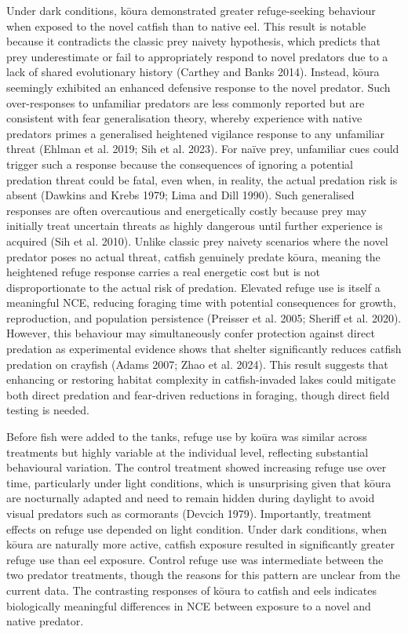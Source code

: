 \documentclass[
  12pt,
  a4paper,
]{scrbook}
\begin{document}
Under dark conditions, kōura demonstrated greater refuge-seeking
behaviour when exposed to the novel catfish than to native eel. This
result is notable because it contradicts the classic prey naivety
hypothesis, which predicts that prey underestimate or fail to
appropriately respond to novel predators due to a lack of shared
evolutionary history (Carthey and Banks 2014). Instead, kōura seemingly
exhibited an enhanced defensive response to the novel predator. Such
over-responses to unfamiliar predators are less commonly reported but
are consistent with fear generalisation theory, whereby experience with
native predators primes a generalised heightened vigilance response to
any unfamiliar threat (Ehlman et al. 2019; Sih et al. 2023). For naïve
prey, unfamiliar cues could trigger such a response because the
consequences of ignoring a potential predation threat could be fatal,
even when, in reality, the actual predation risk is absent (Dawkins and
Krebs 1979; Lima and Dill 1990). Such generalised responses are often
overcautious and energetically costly because prey may initially treat
uncertain threats as highly dangerous until further experience is
acquired (Sih et al. 2010). Unlike classic prey naivety scenarios where
the novel predator poses no actual threat, catfish genuinely predate
kōura, meaning the heightened refuge response carries a real energetic
cost but is not disproportionate to the actual risk of predation.
Elevated refuge use is itself a meaningful NCE, reducing foraging time
with potential consequences for growth, reproduction, and population
persistence (Preisser et al. 2005; Sheriff et al. 2020). However, this
behaviour may simultaneously confer protection against direct predation
as experimental evidence shows that shelter significantly reduces
catfish predation on crayfish (Adams 2007; Zhao et al. 2024). This
result suggests that enhancing or restoring habitat complexity in
catfish-invaded lakes could mitigate both direct predation and
fear-driven reductions in foraging, though direct field testing is
needed.

Before fish were added to the tanks, refuge use by koūra was similar
across treatments but highly variable at the individual level,
reflecting substantial behavioural variation. The control treatment
showed increasing refuge use over time, particularly under light
conditions, which is unsurprising given that kōura are nocturnally
adapted and need to remain hidden during daylight to avoid visual
predators such as cormorants (Devcich 1979). Importantly, treatment
effects on refuge use depended on light condition. Under dark
conditions, when kōura are naturally more active, catfish exposure
resulted in significantly greater refuge use than eel exposure. Control
refuge use was intermediate between the two predator treatments, though
the reasons for this pattern are unclear from the current data. The
contrasting responses of kōura to catfish and eels indicates
biologically meaningful differences in NCE between exposure to a novel
and native predator.
\end{document}
